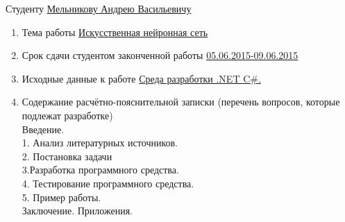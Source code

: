 \documentclass[14pt,a4paper]{extreport}
\begin{document}
	\endcenter
	\raggedright
	Студенту \underline{ Мельникову Андрею Васильевичу }\\
	\begin{enumerate}
	\item Тема работы \underline{Искусственная нейронная сеть}\\ 
	\item Срок сдачи студентом законченной работы \underline{05.06.2015-09.06.2015}
	\item Исходные данные к работе \underline{Среда разработки .NET C\#. }
	\item Содержание расчётно-пояснительной записки (перечень вопросов, которые подлежат разработке)\\
	\underline{\hspace*{16cm}}\hspace*{-16cm}Введение. \\
	
	\underline{\hspace*{16cm}}\hspace*{-16cm}1. Анализ литературных источников.\\
	
	\underline{\hspace*{16cm}}\hspace*{-16cm}2. Постановка задачи\\
	
	\underline{\hspace*{16cm}}\hspace*{-16cm}3.Разработка программного средства. \\
	
	\underline{\hspace*{16cm}}\hspace*{-16cm}4. Тестирование программного средства. \\
	
	\underline{\hspace*{16cm}}\hspace*{-16cm}5. Пример работы. \\
	
	\underline{\hspace*{16cm}}\hspace*{-16cm}Заключение. Приложения. \\


\end{enumerate}
\end{document}
